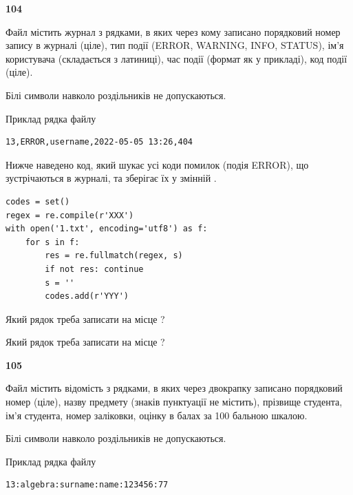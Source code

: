 \newpage

{\begin {center}\textbf{ 104}\end {center}}\par
Файл  містить журнал з рядками, в яких через кому записано поряд\-ко\-вий номер запису в журналі (ціле), тип події (ERROR, WARNING, INFO, STATUS), ім'я користувача (складається з латиниці), час події (фор\-мат як у прикладі), код події (ціле).

Білі символи навколо роздільників не допускаються.

Приклад рядка файлу



\begin{verbatim}
13,ERROR,username,2022-05-05 13:26,404
\end{verbatim}


Нижче наведено код, який шукає усі коди помилок (подія ERROR), що зустріча\-ють\-ся в журналі, та зберігає їх у змінній .



\begin{verbatim}
codes = set()
regex = re.compile(r'XXX')
with open('1.txt', encoding='utf8') as f:
    for s in f:
        res = re.fullmatch(regex, s)
        if not res: continue
        s = ''
        codes.add(r'YYY')
\end{verbatim}





Який рядок треба записати на місце  ?\par
\vspace{5mm}


Який рядок треба записати на місце  ?\par


\newpage

{\begin {center}\textbf{ 105}\end {center}}\par
Файл  містить відомість з рядками, в яких через двокрапку записано поряд\-ковий номер (ціле), назву предмету (знаків пунктуації не містить), прізвище студента, ім'я студента, номер заліковки, оцінку в балах за 100 бальною шкалою.

Білі символи навколо роздільників не допускаються.

Приклад рядка файлу



\begin{verbatim}
13:algebra:surname:name:123456:77
\end{verbatim}


